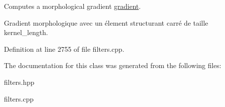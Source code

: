 Computes a morphological gradient \hyperlink{classofeli_1_1_filters_a9c02bc4005c55eeb5a426485af0d03a9}{gradient}. 

Gradient morphologique avec un élement structurant carré de taille kernel\-\_\-length. 

Definition at line 2755 of file filters.\-cpp.



The documentation for this class was generated from the following files\-:\begin{DoxyCompactItemize}
\item 
filters.\-hpp\item 
filters.\-cpp\end{DoxyCompactItemize}
